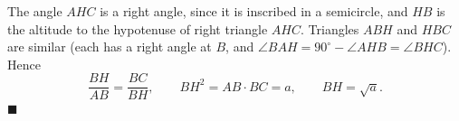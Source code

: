 The angle $AHC$ is a right angle, since it is inscribed in a semicircle, and $HB$ is the altitude to the hypotenuse of right triangle $AHC$. Triangles $ABH$ and $HBC$ are similar (each has a right angle at $B$, and $\angle BAH=90^\circ-\angle AHB=\angle BHC$). Hence
\[
\dfrac{BH}{AB}=\dfrac{BC}{BH},\qquad BH^2=AB\cdot BC=a,\qquad BH=\sqrt a .
\]
$\blacksquare$
